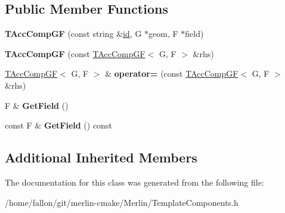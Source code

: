 \subsection*{Public Member Functions}
\begin{DoxyCompactItemize}
\item 
\mbox{\label{classTAccCompGF_a3a87c7450924671af4eae89c26ecc191}} 
{\bfseries T\+Acc\+Comp\+GF} (const string \&\hyperlink{classModelElement_aada171ead2085c75b592cf07d91bc5c2}{id}, G $\ast$geom, F $\ast$field)
\item 
\mbox{\label{classTAccCompGF_a7721085b09260404e9fed3232cb4943a}} 
{\bfseries T\+Acc\+Comp\+GF} (const \hyperlink{classTAccCompGF}{T\+Acc\+Comp\+GF}$<$ G, F $>$ \&rhs)
\item 
\mbox{\label{classTAccCompGF_a6ae806a7799aca2d6443854ad1f23ebf}} 
\hyperlink{classTAccCompGF}{T\+Acc\+Comp\+GF}$<$ G, F $>$ \& {\bfseries operator=} (const \hyperlink{classTAccCompGF}{T\+Acc\+Comp\+GF}$<$ G, F $>$ \&rhs)
\item 
\mbox{\label{classTAccCompGF_a19e8b615c0b97a71ea5527c55fa03f05}} 
F \& {\bfseries Get\+Field} ()
\item 
\mbox{\label{classTAccCompGF_a36118cbd910af30dfc4b7cf7a7828cc2}} 
const F \& {\bfseries Get\+Field} () const
\end{DoxyCompactItemize}
\subsection*{Additional Inherited Members}


The documentation for this class was generated from the following file\+:\begin{DoxyCompactItemize}
\item 
/home/fallon/git/merlin-\/cmake/\+Merlin/Template\+Components.\+h\end{DoxyCompactItemize}
